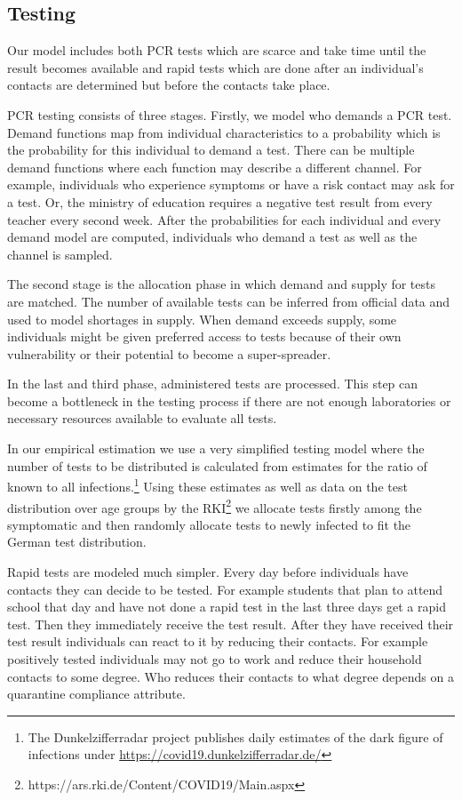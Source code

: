 \subsection{Testing} %
\label{sub:testing}

Our model includes both PCR tests which are scarce and take time until the result becomes
available and rapid tests which are done after an individual's contacts are determined
but before the contacts take place.

PCR testing consists of three stages. Firstly, we model who demands a PCR test. Demand
functions map from individual characteristics to a probability which is the probability
for this individual to demand a test. There can be multiple demand functions where each
function may describe a different channel. For example, individuals who experience
symptoms or have a risk contact may ask for a test. Or, the ministry of education
requires a negative test result from every teacher every second week. After the
probabilities for each individual and every demand model are computed, individuals who
demand a test as well as the channel is sampled.

The second stage is the allocation phase in which demand and supply for tests are
matched. The number of available tests can be inferred from official data and used to
model shortages in supply. When demand exceeds supply, some individuals might be given
preferred access to tests because of their own vulnerability or their potential to
become a super-spreader.

In the last and third phase, administered tests are processed. This step can become a
bottleneck in the testing process if there are not enough laboratories or necessary
resources available to evaluate all tests.

In our empirical estimation we use a very simplified testing model where the number of
tests to be distributed is calculated from estimates for the ratio of known to all
infections.\footnote{The Dunkelzifferradar project publishes daily estimates of the dark
figure of infections under \url{https://covid19.dunkelzifferradar.de/}} Using these
estimates as well as data on the test distribution over age groups by the
RKI\footnote{https://ars.rki.de/Content/COVID19/Main.aspx} we allocate tests firstly
among the symptomatic and then randomly allocate tests to newly infected to fit the
German test distribution.

Rapid tests are modeled much simpler. Every day before individuals have contacts they can
decide to be tested. For example students that plan to attend school that day and have
not done a rapid test in the last three days get a rapid test. Then they immediately
receive the test result. After they have received their test result individuals can react
to it by reducing their contacts. For example positively tested individuals may not go to
work and reduce their household contacts to some degree. Who reduces their contacts to
what degree depends on a quarantine compliance attribute.

